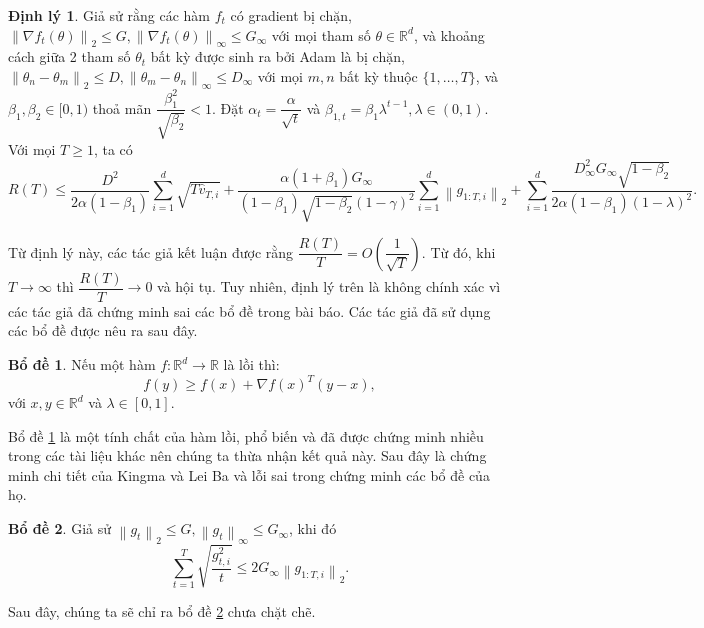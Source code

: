 \documentclass[11pt,oneside,a4paper]{report}
\theoremstyle{definition}
\newtheorem{dl}{Định lý}[section]
\newtheorem{bd}{Bổ đề}[section]
\begin{document}
\begin{dl}
Giả sử rằng các hàm $f_t$ có gradient bị chặn, $\left\|\nabla f_t(\theta)\right\|_2 \leq G,\left\|\nabla f_t(\theta)\right\|_{\infty} \leq G_{\infty}$ với mọi tham số $\theta \in \mathbb{R}^d$, và khoảng cách giữa 2 tham số $\theta_t$ bất kỳ được sinh ra bởi Adam là bị chặn, $\left\|\theta_n-\theta_m\right\|_2 \leq D,\left\|\theta_m-\theta_n\right\|_{\infty} \leq D_{\infty}$ với mọi $m, n$ bất kỳ thuộc $\{1, \ldots, T\}$, và $\beta_1, \beta_2 \in[0,1)$ thoả mãn $\dfrac{\beta_1^2}{\sqrt{\beta_2}}<1$. Đặt $\alpha_t=\dfrac{\alpha}{\sqrt{t}}$ và $\beta_{1, t}=\beta_1 \lambda^{t-1}, \lambda \in(0,1)$. Với mọi $T\geq1$, ta có
$$
R(T) \leq \dfrac{D^2}{2 \alpha\left(1-\beta_1\right)} \sum_{i=1}^d \sqrt{T \hat{v}_{T, i}}+\dfrac{\alpha\left(1+\beta_1\right) G_{\infty}}{\left(1-\beta_1\right) \sqrt{1-\beta_2}(1-\gamma)^2} \sum_{i=1}^d\left\|g_{1: T, i}\right\|_2+\sum_{i=1}^d \dfrac{D_{\infty}^2 G_{\infty} \sqrt{1-\beta_2}}{2 \alpha\left(1-\beta_1\right)(1-\lambda)^2}.
$$
\end{dl}
Từ định lý này, các tác giả kết luận được rằng $\dfrac{R(T)}{T}=O\left(\dfrac{1}{\sqrt{T}}\right)$. Từ đó, khi $T \rightarrow \infty$ thì $\dfrac{R(T)}{T} \rightarrow 0$ và hội tụ. Tuy nhiên, định lý trên là không chính xác vì các tác giả đã chứng minh sai các bổ đề trong bài báo. Các tác giả đã sử dụng các bổ đề được nêu ra sau đây.
\begin{bd}
Nếu một hàm $f: \mathbb{R}^d \rightarrow \mathbb{R}$ là lồi thì:
$$
f(y) \geq f(x)+\nabla f(x)^T(y-x),
$$
với $x, y \in \mathbb{R}^d$ và $\lambda \in[0,1]$.
\label{bd1}
\end{bd}
Bổ đề \ref{bd1} là một tính chất của hàm lồi, phổ biến và đã được chứng minh nhiều trong các tài liệu khác nên chúng ta thừa nhận kết quả này. Sau đây là chứng minh chi tiết của Kingma và Lei Ba và lỗi sai trong chứng minh các bổ đề của họ.
\begin{bd}
Giả sử $\left\|g_t\right\|_2 \leq G,\left\|g_t\right\|_{\infty} \leq G_{\infty}$, khi đó 
$$
\sum_{t=1}^T \sqrt{\dfrac{g_{t, i}^2}{t}} \leq 2 G_{\infty}\left\|g_{1: T, i}\right\|_2.
$$ \label{bd2}
\end{bd}
Sau đây, chúng ta sẽ chỉ ra bổ đề \ref{bd2} chưa chặt chẽ.
\end{document}
